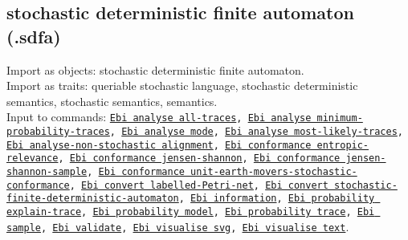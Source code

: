 {\subsection{stochastic deterministic finite automaton (.sdfa)}
Import as objects: stochastic deterministic finite automaton.
\\Import as traits: queriable stochastic language, stochastic deterministic semantics, stochastic semantics, semantics.
\\Input to commands: \texttt{\hyperref[command:Ebi analyse all-traces]{Ebi analyse all-traces}, \hyperref[command:Ebi analyse minimum-probability-traces]{Ebi analyse minimum-probability-traces}, \hyperref[command:Ebi analyse mode]{Ebi analyse mode}, \hyperref[command:Ebi analyse most-likely-traces]{Ebi analyse most-likely-traces}, \hyperref[command:Ebi analyse-non-stochastic alignment]{Ebi analyse-non-stochastic alignment}, \hyperref[command:Ebi conformance entropic-relevance]{Ebi conformance entropic-relevance}, \hyperref[command:Ebi conformance jensen-shannon]{Ebi conformance jensen-shannon}, \hyperref[command:Ebi conformance jensen-shannon-sample]{Ebi conformance jensen-shannon-sample}, \hyperref[command:Ebi conformance unit-earth-movers-stochastic-conformance]{Ebi conformance unit-earth-movers-stochastic-conformance}, \hyperref[command:Ebi convert labelled-Petri-net]{Ebi convert labelled-Petri-net}, \hyperref[command:Ebi convert stochastic-finite-deterministic-automaton]{Ebi convert stochastic-finite-deterministic-automaton}, \hyperref[command:Ebi information]{Ebi information}, \hyperref[command:Ebi probability explain-trace]{Ebi probability explain-trace}, \hyperref[command:Ebi probability model]{Ebi probability model}, \hyperref[command:Ebi probability trace]{Ebi probability trace}, \hyperref[command:Ebi sample]{Ebi sample}, \hyperref[command:Ebi validate]{Ebi validate}, \hyperref[command:Ebi visualise svg]{Ebi visualise svg}, \hyperref[command:Ebi visualise text]{Ebi visualise text}}.
}
